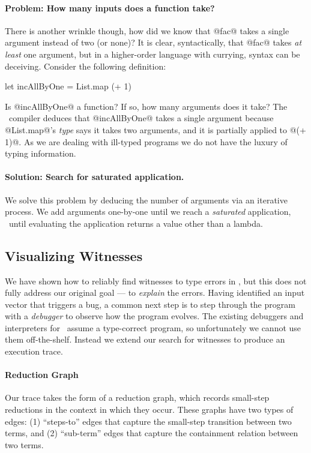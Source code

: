 \paragraph{Problem: How many inputs does a function take?}
%
There is another wrinkle though, how did we know
that @fac@ takes a single argument instead of two
(or none)?
%
It is clear, syntactically, that @fac@ takes \emph{at least} one
argument, but in a higher-order language with currying, syntax can be
deceiving.
%
Consider the following definition:
%
\begin{code}
  let incAllByOne = List.map (+ 1)
\end{code}
%
Is @incAllByOne@ a function?
%
If so, how many arguments does it take?
%
The \ocaml\ compiler deduces that @incAllByOne@ takes a single argument
because @List.map@'s \emph{type} says it takes two arguments, and it is
partially applied to @(+ 1)@.
%
As we are dealing with ill-typed programs we do not have the luxury of
typing information.

\paragraph{Solution: Search for saturated application.}
We solve this problem by deducing the number of arguments
via an iterative process. We add arguments one-by-one
until we reach a \emph{saturated} application, \ie\
until evaluating the application returns a value
other than a lambda.

\subsection{Visualizing Witnesses}
\label{sec:visual-witness}
We have shown how to reliably find witnesses to type errors in \ocaml,
but this does not fully address our original goal --- to \emph{explain}
the errors.
%
Having identified an input vector that triggers a bug, a common next
step is to step through the program with a \emph{debugger} to observe
how the program evolves.
%
The existing debuggers and interpreters for \ocaml\ assume a type-correct
program, so unfortunately we cannot use them off-the-shelf.
%
Instead we extend our search for witnesses to produce an execution
trace.

\paragraph{Reduction Graph}
Our trace takes the form of a reduction graph, which records small-step
reductions in the context in which they occur.
%
These graphs have two types of edges:
%
(1) ``steps-to'' edges that capture the small-step transition between
two terms, and
%
(2) ``sub-term'' edges that capture the containment relation between two
terms.

